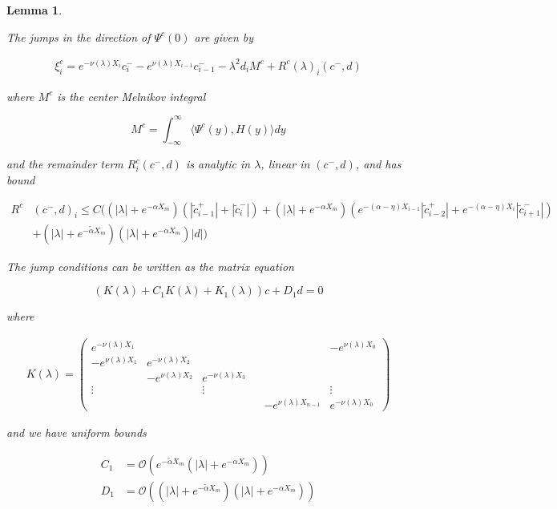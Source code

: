 \documentclass[12pt]{article}
\newtheorem{lemma}{Lemma}
\begin{document}
\begin{lemma}\label{jumpcenteradj}

The jumps in the direction of $\Psi^c(0)$ are given by

\begin{align}\label{xic}
\xi^c_i = e^{-\nu(\lambda) X_i} c_i^- - e^{\nu(\lambda) X_{i-1}} c_{i-1}^- - \lambda^2 d_i M^c + R^c(\lambda)_i(c^-, d)
\end{align}

where $M^c$ is the center Melnikov integral

\begin{equation}\label{Mc}
M^c =  \int_{-\infty}^\infty \langle \Psi^c(y), H(y) \rangle dy 
\end{equation}

and the remainder term $R^c_i(c^-, d)$ is analytic in $\lambda$, linear in $(c^-, d)$, and has bound

\begin{align}\label{Rc}
R^c&(c^-, d)_i \leq C \Big(
(|\lambda| + e^{-\alpha X_m})(|\tilde{c}_{i-1}^+| + |\tilde{c}_{i}^-|) + (|\lambda| + e^{-\alpha X_m})( e^{-(\alpha - \eta) X_{i-1}} |\tilde{c}_{i-2}^+| + e^{-(\alpha - \eta) X_i} |\tilde{c}_{i+1}^-|)  \\
&+ (|\lambda| + e^{-\tilde{\alpha} X_m})(|\lambda| + e^{-\alpha X_m})|d|
\Big) \nonumber
\end{align}

The jump conditions can be written as the matrix equation

\begin{equation}\label{matrixjumpc}
(K(\lambda) + C_1 K(\lambda) + K_1(\lambda)) c + D_1 d = 0
\end{equation}

where

\begin{align*}
K(\lambda) =  
\begin{pmatrix}
e^{-\nu(\lambda)X_1} & & & & & -e^{\nu(\lambda)X_0} \\
-e^{\nu(\lambda)X_1} & e^{-\nu(\lambda)X_2} \\
& -e^{\nu(\lambda)X_2} & e^{-\nu(\lambda)X_3} \\
\vdots & & \vdots & &&  \vdots \\
& & & & -e^{\nu(\lambda)X_{n-1}} & e^{-\nu(\lambda)X_0} 
\end{pmatrix}
\end{align*}

and we have uniform bounds

\begin{align*}
C_1 &= \mathcal{O}(e^{-\tilde{\alpha} X_m}(|\lambda| + e^{-\alpha X_m})) \\
D_1 &= \mathcal{O}((|\lambda| + e^{-\tilde{\alpha} X_m})(|\lambda| + e^{-\alpha X_m}))
\end{align*}


\end{lemma}
\end{document}
